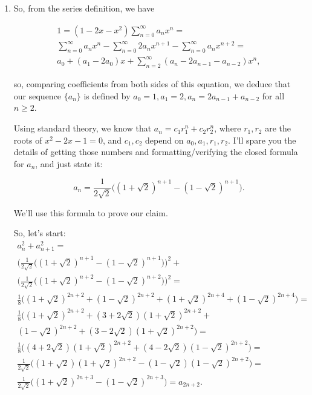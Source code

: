 \documentclass{article}
\begin{document}
\begin{enumerate}
\item So, from the series definition, we have

\begin{eqnarray*}
1 = (1 - 2x -x^2)\sum_{n = 0}^{\infty}a_n x^n = \\
\sum_{n = 0}^{\infty}a_n x^n - \sum_{n = 0}^{\infty}2a_n x^{n + 1} - \sum_{n = 0}^{\infty}a_n x^{n + 2} = \\
a_0 + (a_1 - 2a_0)x + \sum_{n = 2}^{\infty}(a_n -2a_{n - 1} - a_{n - 2}) x^n,
\end{eqnarray*}

so, comparing coefficients from both sides of this equation, we deduce that our
sequence $\{a_n\}$ is defined by $a_0 = 1, a_1 = 2, a_n = 2a_{n - 1} + a_{n - 2}$
for all $n \geq 2$.


Using standard theory, we know that $a_n = c_1r_1^n + c_2r_2^n$, where $r_1, r_2$ are the roots of $x^2 - 2x - 1 = 0$, and $c_1, c_2$ depend on $a_0, a_1, r_1, r_2$. I'll spare you the details of getting those numbers and formatting/verifying the closed formula for $a_n$, and just state it:

$$
	a_n = \frac{1}{2\sqrt2}\bigl((1 + \sqrt{2})^{n + 1} - (1 - \sqrt{2})^{n + 1}\bigr).
$$

We'll use this formula to prove our claim.

So, let's start:
\begin{eqnarray*}
a_n^2 + a_{n + 1}^2 = \\
\bigl(\frac{1}{2\sqrt2}\bigl((1 + \sqrt{2})^{n + 1} - (1 - \sqrt{2})^{n + 1}\bigr)\bigr)^2 + \\
\bigl(\frac{1}{2\sqrt2}\bigl((1 + \sqrt{2})^{n + 2} - (1 - \sqrt{2})^{n + 2}\bigr)\bigr)^2 = \\
\frac{1}{8}\bigl( (1 + \sqrt{2})^{2n + 2} + (1 - \sqrt{2})^{2n + 2} + (1 + \sqrt{2})^{2n + 4} + (1 - \sqrt{2})^{2n + 4}\bigr) = \\ 
\frac{1}{8}\bigl((1 + \sqrt{2})^{2n + 2} + (3 + 2\sqrt{2})(1 + \sqrt{2})^{2n + 2} + \\
(1 - \sqrt{2})^{2n + 2} + (3 - 2\sqrt{2})(1 + \sqrt{2})^{2n + 2}\bigr) = \\
\frac{1}{8}\bigl((4 + 2\sqrt{2})(1 + \sqrt{2})^{2n + 2} + (4 - 2\sqrt{2})(1 - \sqrt{2})^{2n + 2}\bigr) = \\
\frac{1}{2\sqrt2}\bigl((1 + \sqrt{2})(1 + \sqrt{2})^{2n + 2} - (1 - \sqrt{2})(1 - \sqrt{2})^{2n + 2}\bigr) = \\
\frac{1}{2\sqrt2}\bigl((1 + \sqrt{2})^{2n + 3} - (1 - \sqrt{2})^{2n + 3}\bigr) = a_{2n + 2}.
\end{eqnarray*}


\end{enumerate}
\end{document}
